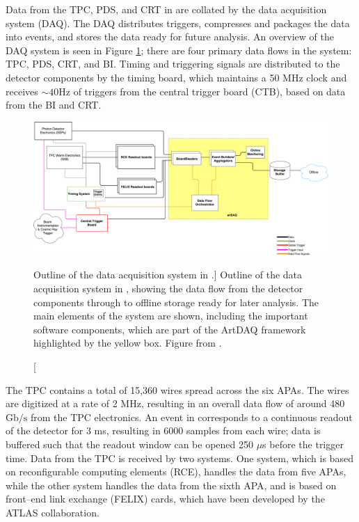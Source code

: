 Data from the TPC, PDS, and CRT in \protodune{} are collated by the data 
acquisition system (DAQ). The DAQ distributes triggers, compresses and packages 
the data into events, and stores the data ready for future analysis. 
An overview of the \protodune{} DAQ system is seen in Figure 
\ref{fig:pdsp_daq}; there are four primary data flows in the system: TPC, PDS, 
CRT, and BI. Timing and triggering signals are distributed to the detector 
components by the timing board, which maintains a 50 MHz clock and receives 
$\sim 40 \mbox{Hz}$ of triggers from the central trigger board (CTB), based on 
data from the BI and CRT\cite{Abi:2017aow}.

\begin{figure}

	\centering

	\includegraphics[width=\textwidth]{figures/pdsp_daq.pdf}

	\caption
	[Outline of the data acquisition system in \protodune{}.]
	{Outline of the data acquisition system in \protodune{}, showing the data flow
	from the detector components through to offline storage ready for later
	analysis. The main elements of the system are shown, including the important 
	software components, which are part of the ArtDAQ framework highlighted by 
	the yellow box. Figure from \cite{Abi:2017aow}.}

	\label{fig:pdsp_daq}

\end{figure}

The \protodune{} TPC contains a total of 15,360 wires spread across the six
APAs. The wires are digitized at a rate of 2 MHz, resulting in an overall data
flow of around 480 $\mbox{Gb/s}$ from the TPC electronics. An event in
\protodune{} corresponds to a continuous readout of the detector for 3 ms,
resulting in 6000 samples from each wire; data is buffered such that the readout
window can be opened 250 $\mu$s before the trigger time. Data from the TPC is
received by two systems. One system, which is based on reconfigurable 
computing elements (RCE)\cite{7431254}, handles the data from five APAs, while 
the other system handles the data from the sixth APA, and is based on 
front--end link exchange (FELIX) cards, which have been developed by the 
ATLAS collaboration\cite{Anderson_2016}.

